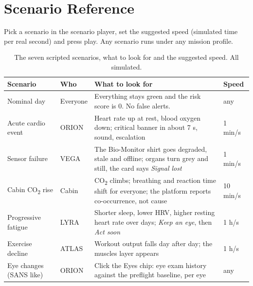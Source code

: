 \section{Scenario Reference}
\label{sec:scenarios}

Pick a scenario in the scenario player, set the suggested speed (simulated time per real second) and press play. Any scenario runs under any mission profile.

\begin{table}[H]
\centering
\vspace{0.4em}
\caption{The seven scripted scenarios, what to look for and the suggested speed. All simulated.}
\label{tab:scenarios}
\footnotesize
\begin{tabular}{p{2.8cm}p{1.6cm}p{7.6cm}p{1.4cm}}
\hline
\textbf{Scenario} & \textbf{Who} & \textbf{What to look for} & \textbf{Speed} \\
\hline
Nominal day & Everyone & Everything stays green and the risk score is 0. No false alerts. & any \\
Acute cardio event & ORION & Heart rate up at rest, blood oxygen down; critical banner in about 7 s, sound, escalation & 1 min/s \\
Sensor failure & VEGA & The Bio-Monitor shirt goes degraded, stale and offline; organs turn grey and still, the card says \textit{Signal lost} & 1 min/s \\
Cabin CO\textsubscript{2} rise & Cabin & CO\textsubscript{2} climbs; breathing and reaction time shift for everyone; the platform reports co-occurrence, not cause & 10 min/s \\
Progressive fatigue & LYRA & Shorter sleep, lower HRV, higher resting heart rate over days; \textit{Keep an eye}, then \textit{Act soon} & 1 h/s \\
Exercise decline & ATLAS & Workout output falls day after day; the muscles layer appears & 1 h/s \\
Eye changes (SANS like) & ORION & Click the Eyes chip: eye exam history against the preflight baseline, per eye & any \\
\hline
\end{tabular}
\vspace{0.6em}
\end{table}

